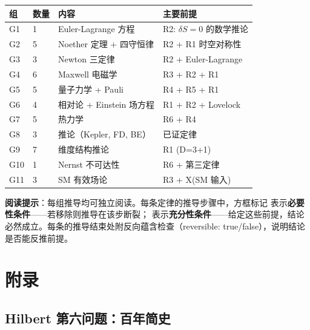 \documentclass[11pt,a4paper,openany]{book}
\begin{document}
\begin{center}
\small
\begin{tabular}{p{1.5cm}p{1.5cm}p{5cm}p{5cm}}
\toprule
\textbf{组} & \textbf{数量} & \textbf{内容} & \textbf{主要前提} \\
\midrule
G1 & 1 & Euler-Lagrange 方程 & R2: $\delta S=0$ 的数学推论 \\
G2 & 5 & Noether 定理 + 四守恒律 & R2 + R1 时空对称性 \\
G3 & 3 & Newton 三定律 & R2 + Euler-Lagrange \\
G4 & 6 & Maxwell 电磁学 & R3 + R2 + R1 \\
G5 & 5 & 量子力学 + Pauli & R4 + R5 + R1 \\
G6 & 4 & 相对论 + Einstein 场方程 & R1 + R2 + Lovelock \\
G7 & 5 & 热力学 & R6 + R4 \\
G8 & 3 & 推论（Kepler, FD, BE） & 已证定律 \\
G9 & 7 & 维度结构推论 & R1 (D=3+1) \\
G10 & 1 & Nernst 不可达性 & R6 + 第三定律 \\
G11 & 3 & SM 有效场论 & R3 + X(SM 输入) \\
\bottomrule
\end{tabular}
\end{center}

\vspace{12pt}

\textbf{阅读提示}：每组推导均可独立阅读。每条定律的推导步骤中，方框标记 \fbox{[N]} 表示\textbf{必要性条件}——若移除则推导在该步断裂；\fbox{[S]} 表示\textbf{充分性条件}——给定这些前提，结论必然成立。每条的推导结束处附反向蕴含检查（reversible: true/false），说明结论是否能反推前提。

\clearpage











\appendix
\part{附录}

\chapter{Hilbert 第六问题：百年简史}
\label{app:hilbert}
\end{document}
